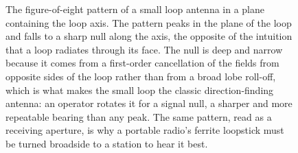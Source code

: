 \begin{figure}[htbp]
\centering
{}
\caption[Radiation pattern of a small loop antenna]{The figure-of-eight
pattern of a small loop antenna in a plane containing the loop axis. The
pattern peaks in the plane of the loop and falls to a sharp null along the
axis, the opposite of the intuition that a loop radiates through its face.
The null is deep and narrow because it comes from a first-order
cancellation of the fields from opposite sides of the loop rather than
from a broad lobe roll-off, which is what makes the small loop the classic
direction-finding antenna: an operator rotates it for a signal null, a
sharper and more repeatable bearing than any peak. The same pattern, read
as a receiving aperture, is why a portable radio's ferrite loopstick must
be turned broadside to a station to hear it best.}
\label{fig:vol04ch10:loop-pattern}
\end{figure}
